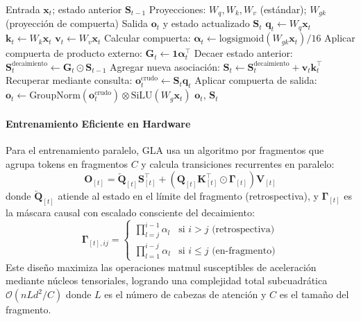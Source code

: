 \begin{algorithm}[H]
\caption{Atención Lineal con Compuerta (Forma Recurrente)}
\begin{algorithmic}[1]
\Require Entrada $\mathbf{x}_t$; estado anterior $\mathbf{S}_{t-1}$
\Require Proyecciones: $W_q, W_k, W_v$ (estándar); $W_{gk}$ (proyección de compuerta)
\Ensure Salida $\mathbf{o}_t$ y estado actualizado $\mathbf{S}_t$
\State $\mathbf{q}_t \gets W_q \mathbf{x}_t$
\State $\mathbf{k}_t \gets W_k \mathbf{x}_t$
\State $\mathbf{v}_t \gets W_v \mathbf{x}_t$
\State Calcular compuerta: $\boldsymbol{\alpha}_t \gets \text{logsigmoid}(W_{gk} \mathbf{x}_t) / 16$ 
\State Aplicar compuerta de producto externo: $\mathbf{G}_t \gets \mathbf{1} \boldsymbol{\alpha}_t^\top$  
\State Decaer estado anterior: $\mathbf{S}_t^\text{decaimiento} \gets \mathbf{G}_t \odot \mathbf{S}_{t-1}$ 
\State Agregar nueva asociación: $\mathbf{S}_t \gets \mathbf{S}_t^\text{decaimiento} + \mathbf{v}_t \mathbf{k}_t^\top$
\State Recuperar mediante consulta: $\mathbf{o}_t^\text{crudo} \gets \mathbf{S}_t \mathbf{q}_t$
\State Aplicar compuerta de salida: $\mathbf{o}_t \gets \text{GroupNorm}(\mathbf{o}_t^\text{crudo}) \otimes \text{SiLU}(W_g \mathbf{x}_t)$
\Return $\mathbf{o}_t$, $\mathbf{S}_t$
\end{algorithmic}
\end{algorithm}

\paragraph{Entrenamiento Eficiente en Hardware}

Para el entrenamiento paralelo, GLA usa un algoritmo por fragmentos que agrupa tokens en fragmentos $C$ y calcula transiciones recurrentes en paralelo:
\[
\mathbf{O}_{[t]} = \overleftarrow{\mathbf{Q}}_{[t]} \mathbf{S}_{[t]}^\top + \left(\mathbf{Q}_{[t]} \mathbf{K}_{[t]}^\top \odot \mathbf{\Gamma}_{[t]}\right) \mathbf{V}_{[t]}
\]
donde $\overleftarrow{\mathbf{Q}}_{[t]}$ atiende al estado en el límite del fragmento (retrospectiva), y $\mathbf{\Gamma}_{[t]}$ es la máscara causal con escalado consciente del decaimiento:
\[
\mathbf{\Gamma}_{[t],ij} = \begin{cases} \prod_{l=j}^{i-1} \alpha_l & \text{si } i > j \text{ (retrospectiva)} \\ \prod_{l=1}^{i-j} \alpha_l & \text{si } i \le j \text{ (en-fragmento)} \end{cases}
\]
Este diseño maximiza las operaciones matmul susceptibles de aceleración mediante núcleos tensoriales, logrando una complejidad total subcuadrática $\mathcal{O}(nLd^2/C)$ donde $L$ es el número de cabezas de atención y $C$ es el tamaño del fragmento.


